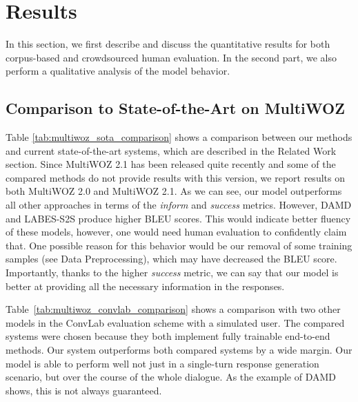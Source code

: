 \documentclass[11pt,a4paper]{article}
\newcommand{\multiwoz}[0]{MultiWOZ 2.0\xspace}
\newcommand{\multiwozn}[0]{MultiWOZ 2.1\xspace}
\newcommand{\augpt}[0]{our model\xspace}
\begin{document}
\section{Results}
\label{sec:results}

In this section, we first describe and discuss the quantitative results for both corpus-based and crowdsourced human evaluation.
In the second part, we also perform a qualitative analysis of the model behavior.

\subsection{Comparison to State-of-the-Art on MultiWOZ}

Table \ref{tab:multiwoz_sota_comparison} shows a comparison between our methods and current state-of-the-art systems, which are described in the Related Work section.
Since \multiwozn has been released quite recently and some of the compared methods do not provide results with this version, we report results on both \multiwoz and MultiWOZ 2.1.
As we can see, \augpt outperforms all other approaches in terms of the \emph{inform} and \emph{success} metrics. However, DAMD and LABES-S2S produce higher BLEU scores.
This would indicate better fluency of these models, however, one would need human evaluation to confidently claim that.
One possible reason for this behavior would be our removal of some training samples (see Data Preprocessing), which may have decreased the BLEU score.
Importantly, thanks to the higher \emph{success} metric, we can say that our model is better at providing all the necessary information in the responses.

Table~\ref{tab:multiwoz_convlab_comparison} shows a comparison with two other models in the ConvLab evaluation scheme with a simulated user. The compared systems were chosen because they both implement fully trainable end-to-end methods. Our system outperforms both compared systems by a wide margin. Our model is able to perform well not just in a single-turn response generation scenario, but over the course of the whole dialogue. As the example of DAMD shows, this is not always guaranteed.
\end{document}
